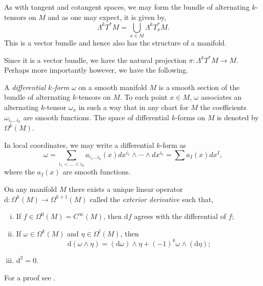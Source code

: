 \documentclass[12pt,a4paper]{article}
\begin{document}
As with tangent and cotangent spaces, we may form the bundle of alternating $k$-tensors on $M$ and as one may expect, it is given by,
\[
\Lambda^kT^*M=\bigcup_{x\in M}\Lambda^kT^*_xM.
\]  
This is a vector bundle and hence also has the structure of a manifold.

Since it is a vector bundle, we have the natural projection $\pi:\Lambda^kT^*M\to M$. Perhaps more importantly however, we have the following.
\begin{definition}
A \textit{differential $k$-form} $\omega$ on a smooth manifold $M$ is a smooth section of the bundle of alternating $k$-tensors on $M$. To each point $x\in M$, $\omega$ associates an alternating $k$-tensor $\omega_x$ in such a way that in any chart for $M$ the coefficients $\omega_{i_1\ldots i_k}$ are smooth functions. The space of differential $k$-forms on $M$ is denoted by $\Omega^k(M)$.
\end{definition}
In local coordinates, we may write a differential $k$-form as
\[
\omega=\sum_{i_1<\ldots<i_k}a_{i_1\ldots i_k}(x)dx^{i_1}\wedge\cdots\wedge dx^{i_k}=\sum a_I(x)dx^I,	
\]
where the $a_I(x)$ are smooth functions.
\pagebreak
\begin{proposition}
On any manifold $M$ there exists a unique linear operator $\mathrm{d}:\Omega^k(M)\to\Omega^{k+1}(M)$ called the \textit{exterior derivative} such that,
\begin{enumerate}[(i)]
\item If $f\in\Omega^0(M)=C^{\infty}(M)$, then $\mathrm{d}f$ agrees with the differential of $f$;
\item If $\omega\in\Omega^k(M)$ and $\eta\in\Omega^l(M)$, then
\[
\mathrm{d}(\omega\wedge\eta)=(\mathrm{d}\omega)\wedge\eta+(-1)^k\omega\wedge(\mathrm{d}\eta);
\]
\item $\mathrm{d}^2=0$.
\end{enumerate}
\end{proposition}
For a proof see \cite{andrews}.\\
\end{document}
